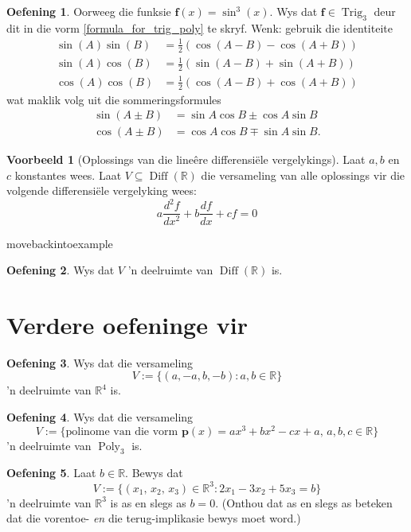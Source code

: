 \documentclass[a4paper,11pt]{book}
\theoremstyle{definition}
\newtheorem{exercise}{Oefening}
\newtheorem{example_environment}{Voorbeeld}[chapter]
\newcommand{\ve}[1]{\mathbf{#1}}
\newcommand{\furtherexercises}{\section*{Verdere oefeninge vir
\thesection}}
\newenvironment{example}
	{
		\begin{oframed}
		\begin{example_environment}
	}
	{
		\end{example_environment}
		\end{oframed}
	}
\DeclareMathOperator{\Diff}{Diff}
\DeclareMathOperator{\Poly}{Poly}
\DeclareMathOperator{\Trig}{Trig}
\begin{document}
\begin{exercise} Oorweeg die funksie $\ve{f} (x) = \sin^3(x)$. Wys dat
	$\ve{f} \in \Trig_3$ deur dit in die vorm
	\eqref{formula_for_trig_poly} te skryf. Wenk: gebruik die
	identiteite \label{trig_ex_early}
	\begin{align*}
	\sin(A) \sin(B) &= \frac{1}{2}(\cos(A-B) - \cos(A+B)) \\
	\sin(A) \cos(B) &= \frac{1}{2}(\sin(A-B) + \sin(A+B)) \\
	\cos(A)\cos(B) &= \frac{1}{2}(\cos(A-B) + \cos(A+B))
	\end{align*}
	wat maklik volg uit die sommeringsformules
	\begin{align*}
	\sin(A \pm B) &= \sin A \cos B \pm \cos A \sin B \\
	\cos(A \pm B) &= \cos A \cos B \mp \sin A \sin B.
	\end{align*}
\end{exercise}

\begin{example}[Oplossings van die line{\^e}re differensi{\"e}le
	vergelykings] Laat $a,b$ en $c$ konstantes wees. Laat $V \subseteq
	\Diff(\mathbb{R})$ die versameling van alle oplossings vir die volgende
	differensi{\"e}le vergelyking wees:
	\[
		a \frac{d^2f}{dx^2} + b \frac{df}{dx} + cf = 0
	\]

\end{example}movebackintoexample
	\begin{exercise}
	Wys dat $V$ 'n deelruimte van $\Diff(\mathbb{R})$ is.
\end{exercise}
\furtherexercises

\begin{exercise} Wys dat die versameling
\[
 V := \{ (a, -a, b, -b) : a, b \in \mathbb{R} \}
\]
'n deelruimte van $\mathbb{R}^4$ is.
\end{exercise}

\begin{exercise} Wys dat die versameling
	\[
		V := \{ \mbox{polinome van die vorm } \ve{p}(x) = ax^3 + bx^2 - cx
		+ a, \, a,b,c \in \mathbb{R}\}
	\]
	'n deelruimte van $\Poly_3$ is.
\end{exercise}

\begin{exercise} Laat $b \in \mathbb{R}$. Bewys dat
	\[
		V := \{ (x_1, \, x_2, \, x_3) \in \mathbb{R}^3 : 2x_1 - 3x_2 + 5x_3
		= b \}
	\]
	'n deelruimte van $\mathbb{R}^3$ is as en slegs as $b=0$. (Onthou dat
	as en slegs as beteken dat die vorentoe- \emph{en} die terug-implikasie
	bewys moet word.)
\end{exercise}
\end{document}

